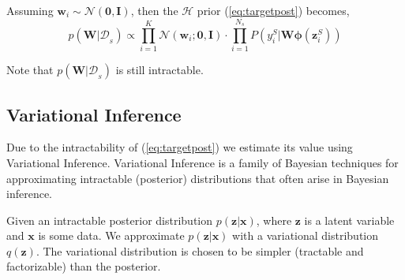 \documentclass[10pt,twocolumn,letterpaper]{article}
\newcommand{\vect}[1]{\boldsymbol{\mathbf{#1}}}
\begin{document}
Assuming \(\vect{w}_i \sim \mathcal{N}(\vect{0}, \vect{I})\), then the \(\mathcal{H}\) prior (\ref{eq:targetpost}) becomes,
    \begin{equation}
        p(\vect{W}|\mathcal{D}_{_{S}}) \propto \prod_{i=1}^{K}\mathcal{N}(\vect{w}_i ; \vect{0}, \vect{I}) \cdot \prod_{i=1}^{N_s} P(y_i^{S} | \vect{W \phi}(\vect{z}_i^{S}))
    \end{equation}
    
Note that \(p(\vect{W}|\mathcal{D}_{_{S}})\) is still intractable.

\subsection{Variational Inference}
Due to the intractability of (\ref{eq:targetpost}) we estimate its value using Variational Inference.  Variational Inference is a family of Bayesian techniques for approximating intractable (posterior) distributions that often arise in Bayesian inference. 

Given an intractable posterior distribution \(p(\vect{z}|\vect{x})\), where \(\vect{z}\) is  a latent variable and \(\vect{x}\) is some data.
We approximate \(p(\vect{z}|\vect{x})\) with a variational distribution \(q(\vect{z})\). The variational distribution is chosen to be simpler (tractable and factorizable) than the posterior. 
\end{document}
